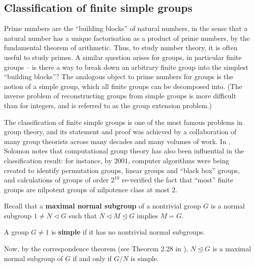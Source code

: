 \subsection{Classification of finite simple groups}

Prime numbers are the ``building blocks'' of natural numbers, in the sense that a natural number has a unique factorisation as a product of prime numbers, by the fundamental theorem of arithmetic. Thus, to study number theory, it is often useful to study primes. A similar question arises for groups, in particular finite groups -- is there a way to break down an arbitrary finite group into the simplest ``building blocks''? The analogous object to prime numbers for groups is the notion of a simple group, which all finite groups can be decomposed into. (The inverse problem of reconstructing groups from simple groups is more difficult than for integers, and is referred to as the group extension problem.)

The classification of finite simple groups is one of the most famous problems in group theory, and its statement and proof was achieved by a collaboration of many group theorists across many decades and many volumes of work. In \cite{solomon2001}, Solomon notes that computational group theory has also been influential in the classification result: for instance, by 2001, computer algorithms were being created to identify permutation groups, linear groups and ``black box'' groups, and calculations of groups of order $2^{10}$ re-verified the fact that ``most'' finite groups are nilpotent groups of nilpotence class at most 2.

Recall that a \textbf{maximal normal subgroup} of a nontrivial group $G$ is a normal subgroup $1 \neq N \lhd G$ such that $N \lhd M \unlhd G$ implies $M = G$.

\begin{definition}\label{def:simple_group}
    A group $G \neq 1$ is \textbf{simple} if it has no nontrivial normal subgroups.
\end{definition}

 Now, by the correspondence theorem (see Theorem 2.28 in \cite{rotman_intro_theory_groups1995}), $N \unlhd G$ is a maximal normal subgroup of $G$ if and only if $G/N$ is simple. 

